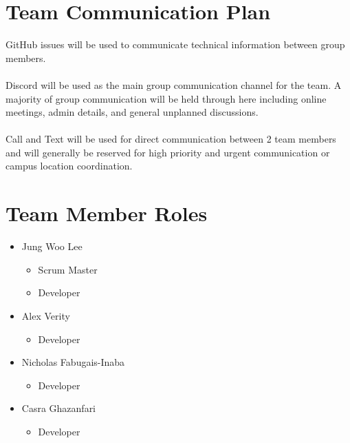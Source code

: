 \documentclass{article}
\begin{document}
\section{Team Communication Plan}


\indent GitHub issues will be used to communicate technical information 
between group members.
\\
\\
\indent Discord will be used as the main group communication channel for the team. A majority 
of group communication will be held through here including online meetings, admin details, 
and general unplanned discussions. 
\\
\\
\indent Call and Text will be used for direct communication between 2 team members
and will generally be reserved for high priority and urgent communication or 
campus location coordination. 

\section{Team Member Roles}


\begin{itemize}
	\item Jung Woo Lee
	\begin{itemize}
	  \item Scrum Master
	  \item Developer
  \end{itemize}
	\item Alex Verity
  \begin{itemize}
	  \item Developer
  \end{itemize}
  \item Nicholas Fabugais-Inaba
  \begin{itemize}
	  \item Developer
  \end{itemize}
  \item Casra Ghazanfari
  \begin{itemize}
	  \item Developer
  \end{itemize}
\end{itemize}
\end{document}
